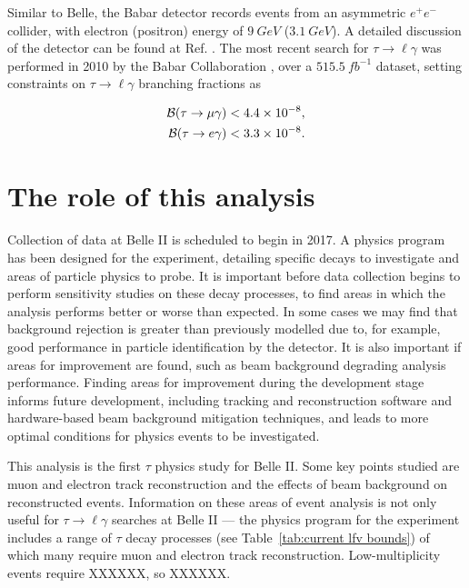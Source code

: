 \documentclass[12pt]{thesis}  %
\newcommand{\br}{\mathcal{B}}
\newcommand{\tmg}{\tau\to\mu\gamma}
\newcommand{\tlg}{\tau\to\ell\gamma}
\begin{document}
Similar to Belle, the Babar detector records events from an asymmetric $e^+e^-$ collider, with electron (positron) energy of $\SI{9}{GeV}$ ($\SI{3.1}{GeV}$). A detailed discussion of the detector can be found at Ref. \cite{Aubert:2001}. The most recent search for $\tlg$ was performed in 2010 by the Babar Collaboration \cite{Aubert:2009ag}, over a $\SI{515.5}{fb^{-1}}$ dataset, setting constraints on $\tlg$ branching fractions as

\begin{align*}
\br(\tmg)&<\num{4.4d-8},\\
\br(\tau\to e \gamma)&<\num{3.3d-8}.
\end{align*}




\section{The role of this analysis}

Collection of data at Belle II is scheduled to begin in 2017. A physics program has been designed for the experiment, detailing specific decays to investigate and areas of particle physics to probe. It is important before data collection begins to perform sensitivity studies on these decay processes, to find areas in which the analysis performs better or worse than expected. In some cases we may find that background rejection is greater than previously modelled due to, for example, good performance in particle identification by the detector. It is also important if areas for improvement are found, such as beam background degrading analysis performance. Finding areas for improvement during the development stage informs future development, including tracking and reconstruction software and hardware-based beam background mitigation techniques, and leads to more optimal conditions for physics events to be investigated.


This analysis is the first $\tau$ physics study for Belle II. Some key points studied are muon and electron track reconstruction and the effects of beam background on reconstructed events. Information on these areas of event analysis is not only useful for $\tau\to\ell\gamma$ searches at Belle II --- the physics program for the experiment includes a range of $\tau$ decay processes (see Table~\ref{tab:current lfv bounds}) of which many require muon and electron track reconstruction. Low-multiplicity events require XXXXXX, so XXXXXX.
\end{document}
